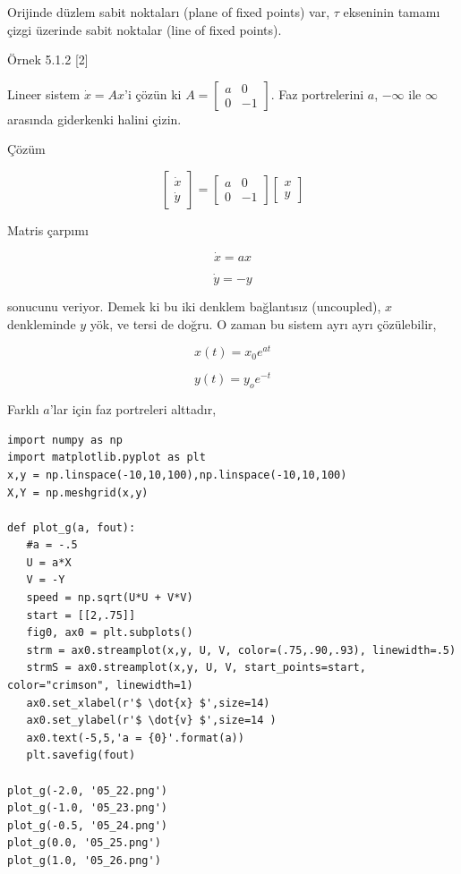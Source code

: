 \documentclass[12pt,fleqn]{article}\usepackage{../../common}
\begin{document}
Orijinde düzlem sabit noktaları (plane of fixed points) var, $\tau$ ekseninin
tamamı çizgi üzerinde sabit noktalar (line of fixed points). 

Örnek 5.1.2 [2]

Lineer sistem $\dot{x} = Ax$'i çözün ki
$A = \left[\begin{array}{rr}a&0\\0&-1\end{array}\right]$. Faz portrelerini
$a$, $-\infty$ ile $\infty$ arasında giderkenki halini çizin.

Çözüm 

$$ 
\left[\begin{array}{r}
\dot{x} \\ \dot{y} 
\end{array}\right]
=
\left[\begin{array}{rr}
a & 0 \\ 0 & -1
\end{array}\right]
\left[\begin{array}{r}
x \\ y
\end{array}\right]
$$

Matris çarpımı 

$$ \dot{x} = ax$$

$$ \dot{y} = -y$$ 

sonucunu veriyor. Demek ki bu iki denklem bağlantısız (uncoupled), $x$
denkleminde $y$ yök, ve tersi de doğru. O zaman bu sistem ayrı ayrı
çözülebilir,

$$ x(t) = x_0 e^{at}$$

$$ y(t) = y_o e^{-t}$$

Farklı $a$'lar için faz portreleri alttadır,

\begin{verbatim}
import numpy as np
import matplotlib.pyplot as plt
x,y = np.linspace(-10,10,100),np.linspace(-10,10,100)
X,Y = np.meshgrid(x,y)

def plot_g(a, fout):
   #a = -.5
   U = a*X
   V = -Y
   speed = np.sqrt(U*U + V*V)
   start = [[2,.75]]
   fig0, ax0 = plt.subplots()
   strm = ax0.streamplot(x,y, U, V, color=(.75,.90,.93), linewidth=.5)
   strmS = ax0.streamplot(x,y, U, V, start_points=start, color="crimson", linewidth=1)
   ax0.set_xlabel(r'$ \dot{x} $',size=14)
   ax0.set_ylabel(r'$ \dot{v} $',size=14 )
   ax0.text(-5,5,'a = {0}'.format(a))
   plt.savefig(fout)

plot_g(-2.0, '05_22.png')
plot_g(-1.0, '05_23.png')
plot_g(-0.5, '05_24.png')
plot_g(0.0, '05_25.png')
plot_g(1.0, '05_26.png')
\end{verbatim}
\end{document}
